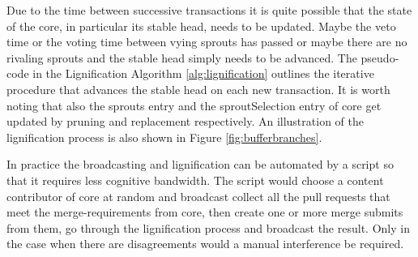 Due to the time between successive transactions it is quite possible that the state of the core, in particular its stable head, needs to be updated. Maybe the veto time or the voting time between vying sprouts has passed or maybe there are no rivaling sprouts and the stable head simply needs to be advanced. The pseudo-code in the Lignification Algorithm \ref{alg:lignification} outlines the iterative procedure that advances the stable head on each new transaction. It is worth noting that also the sprouts entry and the sproutSelection entry of core get updated by pruning and replacement respectively.
An illustration of the lignification process is also shown in Figure \ref{fig:bufferbranches}.

In practice the broadcasting and lignification can be automated by a script so that it requires less cognitive bandwidth. The script would choose a content contributor of core at random and broadcast collect all the pull requests that meet the merge-requirements from core, then create one or more merge submits from them, go through the lignification process and broadcast the result. Only in the case when there are disagreements would a manual interference be required.

